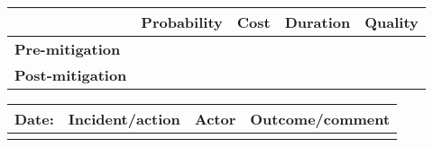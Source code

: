 \begin{table}
	\begin{tabularx}{\textwidth}{| l | l | X | X | X |}
		\hline
		 &  \textbf{Probability} & \textbf{Cost} & \textbf{Duration} & \textbf{Quality} \\ \hline
		\textbf{Pre-mitigation} & & & & \\ \hline
		\textbf{Post-mitigation} & & & & \\ \hline \hline
	\end{tabularx}
	\begin{tabularx}{\textwidth}{| l | X | l | X |}
		\hline
		\textbf{Date:} & \textbf{Incident/action} & \textbf{Actor} & \textbf{Outcome/comment} \\ \hline
		 &  &  &  \\ \hline
	\end{tabularx}%
\end{table}

